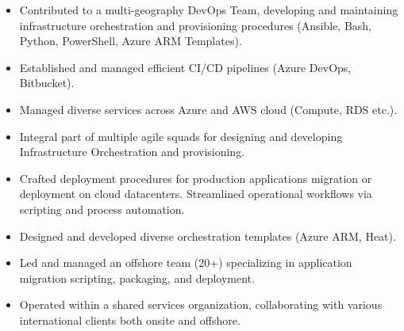 \documentclass[10pt,a4paper]{altacv}
\begin{document}
\begin{itemize}
\item Contributed to a multi-geography DevOps Team, developing and maintaining infrastructure orchestration and provisioning procedures (Ansible, Bash, Python, PowerShell, Azure ARM Templates).
\item Established and managed efficient CI/CD pipelines (Azure DevOps, Bitbucket).
\item Managed diverse services across Azure and AWS cloud (Compute, RDS etc.).
\end{itemize}
\vspace{.2cm}
\begin{itemize}
\item Integral part of multiple agile squads for designing and developing Infrastructure Orchestration and provisioning.
\item Crafted deployment procedures for production applications migration or deployment on cloud datacenters. Streamlined operational workflows via scripting and process automation.
\item Designed and developed diverse orchestration templates (Azure ARM, Heat).

\end{itemize}
\vspace{.2cm}
\begin{itemize}
\item Led and managed an offshore team (20+) specializing in application migration scripting, packaging, and deployment.
\item Operated within a shared services organization, collaborating with various international clients both onsite and offshore.
\end{itemize}




\end{document}
